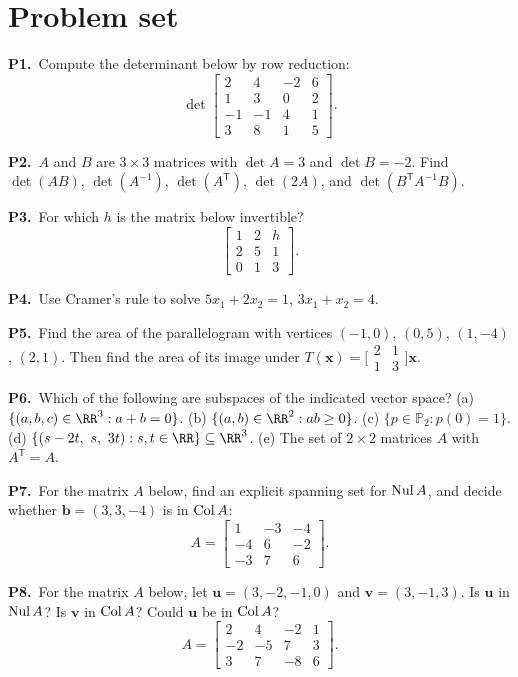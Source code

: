 \documentclass[10pt]{scrartcl}
\newcommand{\vv}[1]{\mathbf{#1}}
\begin{document}
\section{Problem set}
\begin{prob}\textbf{P1.}\ Compute the determinant below by row reduction:
\[
  \det\begin{bmatrix} 2 & 4 & -2 & 6 \\ 1 & 3 & 0 & 2 \\ -1 & -1 & 4 & 1 \\ 3 & 8 & 1 & 5 \end{bmatrix}.
\]
\end{prob}
\begin{prob}\textbf{P2.}\ $A$ and $B$ are $3\times3$ matrices with $\det A=3$ and $\det B=-2$. Find $\det(AB)$, $\det(A^{-1})$, $\det(A^{\mathsf T})$, $\det(2A)$, and $\det(B^{\mathsf T}A^{-1}B)$.
\end{prob}
\begin{prob}\textbf{P3.}\ For which $h$ is the matrix below invertible?
\[
  \begin{bmatrix} 1 & 2 & h \\ 2 & 5 & 1 \\ 0 & 1 & 3 \end{bmatrix}.
\]
\end{prob}
\begin{prob}\textbf{P4.}\ Use Cramer's rule to solve $5x_1+2x_2=1$, $3x_1+x_2=4$.
\end{prob}
\begin{prob}\textbf{P5.}\ Find the area of the parallelogram with vertices $(-1,0)$, $(0,5)$, $(1,-4)$, $(2,1)$. Then find the area of its image under $T(\vv x)=\bigl[\begin{smallmatrix}2&1\\1&3\end{smallmatrix}\bigr]\vv x$.
\end{prob}
\begin{prob}\textbf{P6.}\ Which of the following are subspaces of the indicated vector space? (a) $\{(a,b,c)\in\RR^3: a+b=0\}$. (b) $\{(a,b)\in\RR^2: ab\ge0\}$. (c) $\{p\in\mathbb P_2: p(0)=1\}$. (d) $\{(s-2t,\ s,\ 3t):s,t\in\RR\}\subseteq\RR^3$. (e) The set of $2\times2$ matrices $A$ with $A^{\mathsf T}=A$.
\end{prob}
\begin{prob}\textbf{P7.}\ For the matrix $A$ below, find an explicit spanning set for $\operatorname{Nul} A$, and decide whether $\vv b=(3,3,-4)$ is in $\operatorname{Col} A$:
\[
  A = \begin{bmatrix} 1 & -3 & -4 \\ -4 & 6 & -2 \\ -3 & 7 & 6 \end{bmatrix}.
\]
\end{prob}
\begin{prob}\textbf{P8.}\ For the matrix $A$ below, let $\vv u=(3,-2,-1,0)$ and $\vv v=(3,-1,3)$. Is $\vv u$ in $\operatorname{Nul} A$? Is $\vv v$ in $\operatorname{Col} A$? Could $\vv u$ be in $\operatorname{Col} A$?
\[
  A = \begin{bmatrix} 2 & 4 & -2 & 1 \\ -2 & -5 & 7 & 3 \\ 3 & 7 & -8 & 6 \end{bmatrix}.
\]
\end{prob}
\end{document}
